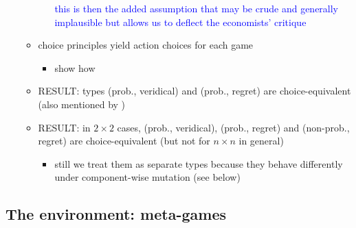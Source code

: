\documentclass[fleqn,reqno,11pt]{article}
\begin{document}
\begin{itemize}
\begin{itemize}
\begin{itemize}
      \textcolor{blue}{this is then the added assumption that may be crude and generally
        implausible but allows us to deflect the economists' critique}
    \end{itemize}
  \item choice principles yield action choices for each game
    \begin{itemize}
    \item show how
    \end{itemize}
  \item RESULT: types (prob., veridical) and (prob., regret) are choice-equivalent (also
    mentioned by \citet{HalpernPass2012:Iterated-Regret})
  \item RESULT: in $2 \times 2$ cases, (prob., veridical), (prob., regret) and (non-prob.,
    regret) are choice-equivalent (but not for $n \times n$ in general)
    \begin{itemize}
    \item still we treat them as separate types because they behave differently under
      component-wise mutation (see below)
    \end{itemize}
  \end{itemize}
\end{itemize}

\subsection{The environment: meta-games}
\end{document}
